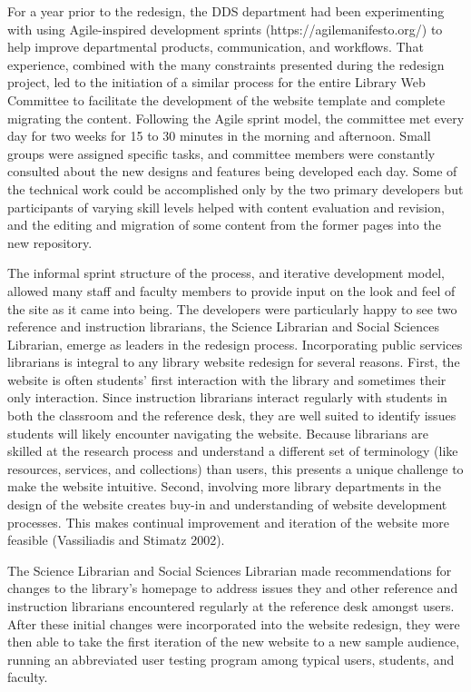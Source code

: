 \documentclass{book}
\begin{document}
For a year prior to the redesign, the DDS department had been experimenting
with using Agile-inspired development sprints (https://agilemanifesto.org/) to
help improve departmental products, communication, and workflows. That
experience, combined with the many constraints presented during the redesign
project, led to the initiation of a similar process for the entire Library Web
Committee to facilitate the development of the website template and complete
migrating the content. Following the Agile sprint model, the committee met
every day for two weeks for 15 to 30 minutes in the morning and afternoon.
Small groups were assigned specific tasks, and committee members were
constantly consulted about the new designs and features being developed each
day. Some of the technical work could be accomplished only by the two primary
developers but participants of varying skill levels helped with content
evaluation and revision, and the editing and migration of some content from
the former pages into the new repository.

The informal sprint structure of the process, and iterative development model,
allowed many staff and faculty members to provide input on the look and feel
of the site as it came into being. The developers were particularly happy to
see two reference and instruction librarians, the Science Librarian and Social
Sciences Librarian, emerge as leaders in the redesign process. Incorporating
public services librarians is integral to any library website redesign for
several reasons. First, the website is often students' first interaction with
the library and sometimes their only interaction. Since instruction librarians
interact regularly with students in both the classroom and the reference desk,
they are well suited to identify issues students will likely encounter
navigating the website. Because librarians are skilled at the research process
and understand a different set of terminology (like resources, services, and
collections) than users, this presents a unique challenge to make the website
intuitive. Second, involving more library departments in the design of the
website creates buy-in and understanding of website development processes.
This makes continual improvement and iteration of the website more feasible
(Vassiliadis and Stimatz 2002).

The Science Librarian and Social Sciences Librarian made recommendations for
changes to the library's homepage to address issues they and other reference
and instruction librarians encountered regularly at the reference desk amongst
users. After these initial changes were incorporated into the website
redesign, they were then able to take the first iteration of the new website
to a new sample audience, running an abbreviated user testing program among
typical users, students, and faculty.
\end{document}
